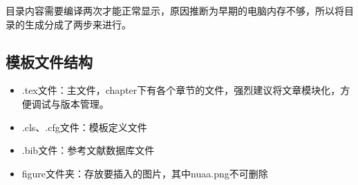 目录内容需要编译两次才能正常显示，原因推断为早期的电脑内存不够，所以将目录的生成分成了两步来进行。

\subsection{模板文件结构}
\begin{itemize}[noitemsep,topsep=0pt,parsep=0pt,partopsep=0pt]
  \item .tex文件：主文件，chapter下有各个章节的文件，强烈建议将文章模块化，方便调试与版本管理。
  \item .cls、.cfg文件：模板定义文件
  \item .bib文件：参考文献数据库文件
  \item figure文件夹：存放要插入的图片，其中nuaa.png不可删除
\end{itemize}
